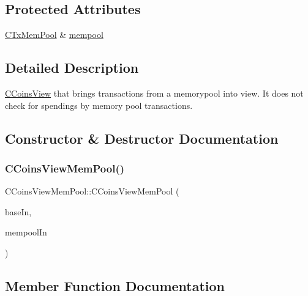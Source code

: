 \subsection*{Protected Attributes}
\begin{DoxyCompactItemize}
\item 
\mbox{\hyperlink{class_c_tx_mem_pool}{C\+Tx\+Mem\+Pool}} \& \mbox{\hyperlink{class_c_coins_view_mem_pool_a7a3870fc65376cb311a0b3abb28fec10}{mempool}}
\end{DoxyCompactItemize}


\subsection{Detailed Description}
\mbox{\hyperlink{class_c_coins_view}{C\+Coins\+View}} that brings transactions from a memorypool into view. It does not check for spendings by memory pool transactions. 

\subsection{Constructor \& Destructor Documentation}
\mbox{\label{class_c_coins_view_mem_pool_aab9a206c304acec322fddf646c7bafb9}} 
\subsubsection{\texorpdfstring{C\+Coins\+View\+Mem\+Pool()}{CCoinsViewMemPool()}}
{\footnotesize\ttfamily C\+Coins\+View\+Mem\+Pool\+::\+C\+Coins\+View\+Mem\+Pool (\begin{DoxyParamCaption}\item[{\mbox{\hyperlink{class_c_coins_view}{C\+Coins\+View}} $\ast$}]{base\+In,  }\item[{\mbox{\hyperlink{class_c_tx_mem_pool}{C\+Tx\+Mem\+Pool}} \&}]{mempool\+In }\end{DoxyParamCaption})}



\subsection{Member Function Documentation}
\mbox{\label{class_c_coins_view_mem_pool_a1a4a556821b1680ff4b73758c8a1e471}} 
